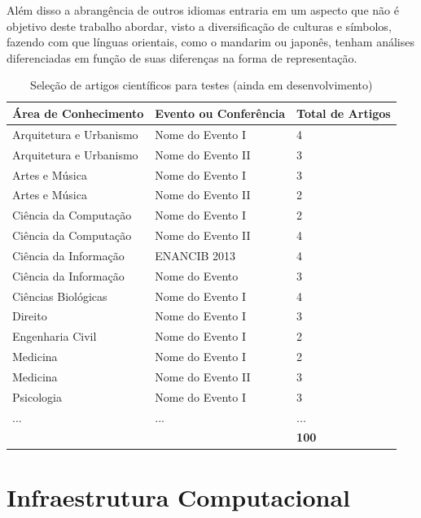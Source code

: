 \documentclass[
	12pt,               %
	openright,          %
	twoside,            %
	a4paper,            %
	english,            %
	brazil              %
	]{abntex2}
\begin{document}
Além disso a abrangência de outros idiomas entraria em um aspecto que não é objetivo deste trabalho abordar, visto a diversificação de culturas e símbolos, fazendo com que línguas orientais, como o mandarim ou japonês, tenham análises diferenciadas em função de suas diferenças na forma de representação.

\begin{table}
    \caption{Seleção de artigos científicos para testes (ainda em desenvolvimento)}
    \begin{center}
        \begin{tabular}{l|l|l}
            Área de Conhecimento & Evento ou Conferência & Total de Artigos \\ 
            \hline
            Arquitetura e Urbanismo & Nome do Evento I & 4 \\ 
			Arquitetura e Urbanismo & Nome do Evento II & 3 \\ 
			Artes e Música & Nome do Evento I & 3 \\ 
			Artes e Música & Nome do Evento II & 2 \\ 
            Ciência da Computação & Nome do Evento I & 2 \\
			Ciência da Computação & Nome do Evento II & 4 \\
            Ciência da Informação & ENANCIB 2013 & 4 \\
            Ciência da Informação & Nome do Evento & 3 \\
            Ciências Biológicas & Nome do Evento I & 4 \\
            Direito & Nome do Evento I & 3 \\
            Engenharia Civil & Nome do Evento I & 2 \\
            Medicina & Nome do Evento I & 2 \\ 
            Medicina & Nome do Evento II & 3 \\ 
            Psicologia & Nome do Evento I & 3 \\
            ... & ... & ... \\
            \hline
             & & \textbf{100}
        \end{tabular}
    \end{center}
    \label{tab:papers-list}
\end{table}

\section{Infraestrutura Computacional}
\end{document}
